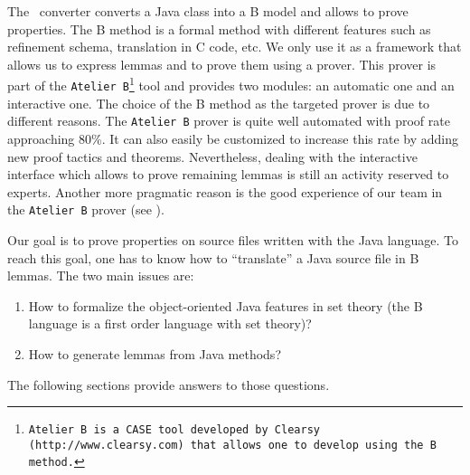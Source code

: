  The \JACK\ converter converts a Java class into a B model and allows to
 prove properties.  The B method \cite{bbook} is a formal method
 with different features such as refinement schema, translation in C
 code, etc.  We only use it as a framework that allows us to express
 lemmas and to prove them using a prover.  This prover is part of the
 \texttt{Atelier B\footnote{\texttt{Atelier B} is a CASE tool developed by
 Clearsy (\texttt{http://www.clearsy.com}) that allows one to develop
 using the B method.}} tool and provides two modules: an automatic one
 and an interactive one.  The choice of the B method as the targeted
 prover is due to different reasons.  The \texttt{Atelier B} prover is quite
 well automated with proof rate approaching 80\%. It can also
 easily be customized to increase this rate by adding new proof tactics
 and theorems.  Nevertheless, dealing with the interactive interface
 which allows to prove remaining lemmas is still an activity reserved
 to experts.  Another more pragmatic reason is the good experience
 of our team in the \texttt{Atelier B} prover (see
 \cite{Casset13:FME:2002,CBR:DSN2002}).

 Our goal is to prove properties on source files written with the Java
 language.  To reach this goal, one has to know how to ``translate'' a
 Java source file in B lemmas.  The two main issues are:
\begin{enumerate}
 \item How to formalize the object-oriented Java features in set theory (the B language is a first order language with set theory)?
 \item How to generate lemmas from Java methods?
\end{enumerate}
The following sections provide answers to those questions.
